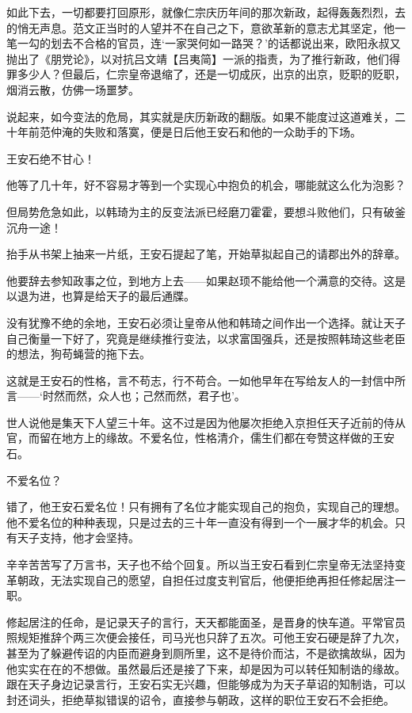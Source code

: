 如此下去，一切都要打回原形，就像仁宗庆历年间的那次新政，起得轰轰烈烈，去的悄无声息。范文正当时的人望并不在自己之下，意欲革新的意志尤其坚定，他一笔一勾的划去不合格的官员，连‘一家哭何如一路哭？’的话都说出来，欧阳永叔又抛出了《朋党论》，以对抗吕文靖【吕夷简】一派的指责，为了推行新政，他们得罪多少人？但最后，仁宗皇帝退缩了，还是一切成灰，出京的出京，贬职的贬职，烟消云散，仿佛一场噩梦。

说起来，如今变法的危局，其实就是庆历新政的翻版。如果不能度过这道难关，二十年前范仲淹的失败和落寞，便是日后他王安石和他的一众助手的下场。

王安石绝不甘心！

他等了几十年，好不容易才等到一个实现心中抱负的机会，哪能就这么化为泡影？

但局势危急如此，以韩琦为主的反变法派已经磨刀霍霍，要想斗败他们，只有破釜沉舟一途！

抬手从书架上抽来一片纸，王安石提起了笔，开始草拟起自己的请郡出外的辞章。

他要辞去参知政事之位，到地方上去——如果赵顼不能给他一个满意的交待。这是以退为进，也算是给天子的最后通牒。

没有犹豫不绝的余地，王安石必须让皇帝从他和韩琦之间作出一个选择。就让天子自己衡量一下好了，究竟是继续推行变法，以求富国强兵，还是按照韩琦这些老臣的想法，狗苟蝇营的拖下去。

这就是王安石的性格，言不苟志，行不苟合。一如他早年在写给友人的一封信中所言——‘时然而然，众人也；己然而然，君子也’。

世人说他是集天下人望三十年。这不过是因为他屡次拒绝入京担任天子近前的侍从官，而留在地方上的缘故。不爱名位，性格清介，儒生们都在夸赞这样做的王安石。

不爱名位？

错了，他王安石爱名位！只有拥有了名位才能实现自己的抱负，实现自己的理想。他不爱名位的种种表现，只是过去的三十年一直没有得到一个一展才华的机会。只有天子支持，他才会坚持。

辛辛苦苦写了万言书，天子也不给个回复。所以当王安石看到仁宗皇帝无法坚持变革朝政，无法实现自己的愿望，自担任过度支判官后，他便拒绝再担任修起居注一职。

修起居注的任命，是记录天子的言行，天天都能面圣，是晋身的快车道。平常官员照规矩推辞个两三次便会接任，司马光也只辞了五次。可他王安石硬是辞了九次，甚至为了躲避传诏的内臣而避身到厕所里，这不是待价而沽，不是欲擒故纵，因为他实实在在的不想做。虽然最后还是接了下来，却是因为可以转任知制诰的缘故。跟在天子身边记录言行，王安石实无兴趣，但能够成为为天子草诏的知制诰，可以封还词头，拒绝草拟错误的诏令，直接参与朝政，这样的职位王安石不会拒绝。

